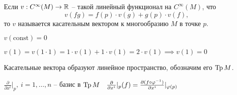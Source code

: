     \begin{definition}
      Если $v: C^\infty(M)\to\mathbb{R}$ -- такой линейный функционал на $C^\infty(M)$, что $$v(fg) = f(p)\cdot v(g) + g(p)\cdot v(f)\text{,}$$
      то $v$ называется касательным вектором к многообразию $M$ в точке $p$.
    \end{definition}
    \begin{remark}
      $v(\text{const}) = 0$

      $v(1) = v(1\cdot 1) = 1\cdot v(1) + 1\cdot v(1) = 2\cdot v(1) \implies v(1) = 0$

    \end{remark}
    Касательные вектора образуют линейное пространство, обозначим его $\operatorname{Tp} M$.
    \begin{lemma}
      $\frac{\partial}{\partial x^i} |_p, \ i=1,\dotsc, n$ -- базис в $\operatorname{Tp} M \quad \frac{\partial}{\partial x^i}|_p(f) = \frac{\partial (f\circ \varphi^{-1})}{\partial x^i}|_{\varphi(p)}$
    \end{lemma}
